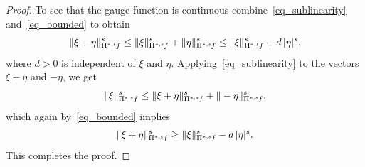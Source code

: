 \documentclass[10pt,a4paper]{amsart}
\newcommand{\ofpp}[1]{\operatorname{\Pi^{\ast,{\it #1}}}\!}
\begin{document}
\begin{proof}
To see that the gauge function is continuous combine~\eqref{eq_sublinearity} and~\eqref{eq_bounded} to obtain
%
\begin{equation*}
\|\xi +\eta \|_{\ofpp{s} f}^{s} \leq \|\xi \|_{\ofpp{s} f}^{s} + \|
\eta \|_{\ofpp{s} f}^{s} \leq \|\xi \|_{\ofpp{s} f}^{s} + d\, |\eta |^{s},
\end{equation*}
%
where $d>0$ is independent of $\xi $ and $\eta $. Applying~\eqref{eq_sublinearity} to the vectors $\xi +\eta $ and $-\eta $, we get
%
\begin{equation*}
\|\xi \|_{\ofpp{s} f}^{s} \leq \|\xi +\eta \|_{\ofpp{s} f}^{s} + \|-
\eta \|_{\ofpp{s} f}^{s},
\end{equation*}
%
which again by~\eqref{eq_bounded} implies
%
\begin{equation*}
\|\xi +\eta \|_{\ofpp{s} f}^{s} \geq \|\xi \|_{\ofpp{s} f}^{s} - d\, |
\eta |^{s}.
\end{equation*}
%
This completes the proof.
\end{proof}
\end{document}
